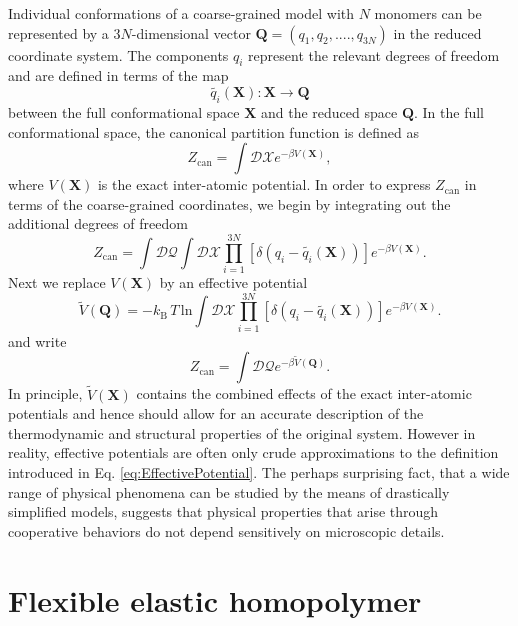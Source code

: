 \documentclass[12pt]{report}
\begin{document}
Individual conformations of a coarse-grained model with $N$ monomers can be represented by a $3N$-dimensional vector $\mathbf{Q} = (q_{1},q_{2},....,q_{3N})$ in the reduced coordinate system. The components $q_{i}$ represent the relevant degrees of freedom and are defined in terms of the map 
%
\begin{equation}
\tilde{q_{i}}(\textbf{X}): \textbf{X} \rightarrow \textbf{Q} 
\end{equation}
%
between the full conformational space $\mathbf{X}$ and the reduced space $\mathbf{Q}$. In the full conformational space, the canonical partition function is defined as
%
\begin{equation}
Z_{\mathrm{can}} = \int \mathcal{DX}e^{-\beta V(\mathbf{X})},
\end{equation}
%
where $V(\mathbf{X})$ is the exact inter-atomic potential. In order to express $Z_{\mathrm{can}}$ in terms of the coarse-grained coordinates, we begin by integrating out the additional degrees of freedom
%
\begin{equation}
Z_{\mathrm{can}} = \int \mathcal{DQ}\int \mathcal{DX}\prod _{i = 1}^{3N} \left[\delta (q_{i} - \tilde{q_{i}}(\mathbf{X}))\right]e^{-\beta V(\mathbf{X})}.
\end{equation}
Next we replace $V(\mathbf{X})$ by an effective potential
%
\begin{equation}
\label{eq:EffectivePotential}
\tilde{V}(\mathbf{Q}) = -k_{\mathrm{B}}\,T\,\mathrm{ln} \int \mathcal{DX}\prod_{i = 1}^{3N} \left[\delta (q_{i} - \tilde{q_{i}}(\mathbf{X}))\right]e^{-\beta V(\mathbf{X})}.
\end{equation}
%
and write
%
\begin{equation}
Z_{\mathrm{can}} = \int \mathcal{DQ}e^{-\beta \tilde{V}(\mathbf{Q})}.
\end{equation}
%
In principle, $\tilde{V}(\mathbf{X})$ contains the combined effects of the exact inter-atomic potentials and hence should allow for an accurate description of the thermodynamic and structural properties of the original system. However in reality, effective potentials are often only crude approximations to the definition introduced in Eq. \ref{eq:EffectivePotential}. The perhaps surprising fact, that a wide range of physical phenomena can be studied by the means of drastically simplified models, suggests that physical properties that arise through cooperative behaviors do not depend sensitively on microscopic details.

\newpage

\section{Flexible elastic homopolymer}
\end{document}

